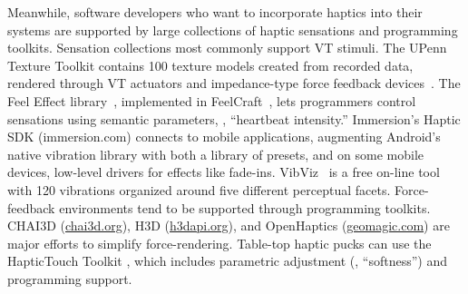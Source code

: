 Meanwhile, software developers who want to incorporate haptics into their systems are supported by large collections of haptic sensations and programming toolkits.
Sensation collections most commonly support VT stimuli. 
The UPenn Texture Toolkit contains 100 texture models created from recorded data, rendered through VT actuators and impedance-type force feedback devices~\citep{Culbertson2014}.
The Feel Effect library~\citep{Israr2014}, implemented in FeelCraft~\citep{SchneiderAsiaHaptics2014}, lets programmers control sensations using semantic parameters, \eg, ``heartbeat intensity.''
Immersion's Haptic SDK (immersion.com) connects to mobile applications, augmenting Android's native vibration library with both a library of presets, and on some mobile devices, low-level drivers for effects like fade-ins.
VibViz~\citep{Seifi2015} is a free on-line tool with 120 vibrations organized around five different perceptual facets.
Force-feedback environments tend to be supported through programming toolkits.
CHAI3D (\url{chai3d.org}), H3D (\url{h3dapi.org}), and OpenHaptics (\url{geomagic.com}) are major efforts to simplify force-rendering.
Table-top haptic pucks can use the HapticTouch Toolkit \citep{Ledo2012}, which includes parametric adjustment (\eg, ``softness'') and programming support.

